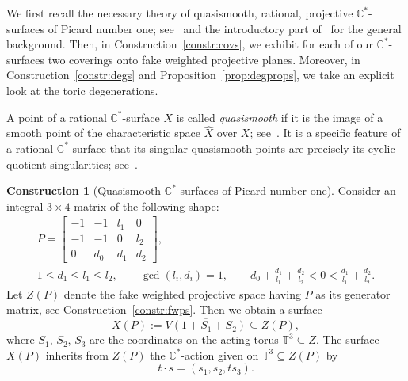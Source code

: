 \documentclass[pdftex]{sigma}
\theoremstyle{definition}
\newtheorem{constr}[thm]{Construction}
\def\CC{{\mathbb C}}
\def\TT{{\mathbb T}}
\begin{document}
We first recall the necessary theory of quasismooth,
rational, projective $\CC^*$-surfaces of Picard number
one; see~\cite[Section~5.4]{ArDeHaLa} and the introductory
part of~\cite{HaHaHaSp} for the general background.
Then, in Construction~\ref{constr:covs}, we exhibit
for each of our $\CC^*$-surfaces two coverings onto
fake weighted projective planes.
Moreover, in Construction~\ref{constr:degs} and
Proposition~\ref{prop:degprops}, we take an explicit
look at the toric degenerations.

A point of a rational
$\CC^*$-surface $X$ is called \emph{quasismooth}
if it is the image of a smooth point of the
characteristic space $\hat X$ over $X$;
see~\cite[Section~5]{HaHaHaSp}.
It is a specific feature of a rational
$\CC^*$-surface that its singular quasismooth
points are precisely its cyclic quotient
singularities; see~\cite[Corollary~6.12]{HaHu}.


\begin{constr}[Quasismooth $\CC^*$-surfaces of Picard number one]
\label{constr:cstarsurf}
Consider an integral $3 \times 4$ matrix of the following shape:
\begin{gather*}
P
 =
\begin{bmatrix}
-1 & -1 & l_1 & 0
\\
-1 & -1 & 0 & l_2
\\
0 & d_0 & d_1 & d_2
\end{bmatrix},
\\
1 \le d_1 \le l_1 \le l_2, \qquad \gcd(l_i,d_i) = 1,
\qquad
d_0 + \frac{d_1}{l_1} + \frac{d_2}{l_2} < 0 < \frac{d_1}{l_1} + \frac{d_2}{l_2}.
\end{gather*}
Let $Z(P)$ denote the fake weighted projective space
having $P$ as its generator matrix, see Construction~\ref{constr:fwps}.
Then we obtain a surface
\[
X(P) := \overline{V(1+S_1+S_2)} \subseteq Z(P),
\]
where $S_1$, $S_2$, $S_3$ are the coordinates on the acting
torus $\TT^3 \subseteq Z$.
The surface $X(P)$ inherits from $Z(P)$ the $\CC^*$-action
given on $\TT^3 \subseteq Z(P)$ by
\[
t \cdot s = (s_1,s_2,ts_3).
\]
\end{constr}
\end{document}
